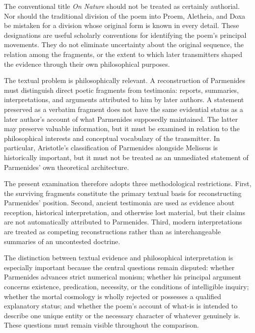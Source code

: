 
The conventional title \textit{On Nature} should not be treated
as certainly authorial. Nor should the traditional division of
the poem into Proem, Aletheia, and Doxa be mistaken for a division
whose original form is known in every detail. These designations
are useful scholarly conventions for identifying the poem's
principal movements. They do not eliminate uncertainty about
the original sequence, the relation among the fragments, or the
extent to which later transmitters shaped the evidence through
their own philosophical purposes.


The textual problem is philosophically relevant. A reconstruction
of Parmenides must distinguish direct poetic fragments from
testimonia: reports, summaries, interpretations, and arguments
attributed to him by later authors. A statement preserved as a
verbatim fragment does not have the same evidential status as a
later author's account of what Parmenides supposedly maintained.
The latter may preserve valuable information, but it must be
examined in relation to the philosophical interests and conceptual
vocabulary of the transmitter. In particular, Aristotle's
classification of Parmenides alongside Melissus is historically
important, but it must not be treated as an unmediated statement
of Parmenides' own theoretical architecture.


The present examination therefore adopts three methodological
restrictions. First, the surviving fragments constitute the
primary textual basis for reconstructing Parmenides' position.
Second, ancient testimonia are used as evidence about reception,
historical interpretation, and otherwise lost material, but
their claims are not automatically attributed to Parmenides.
Third, modern interpretations are treated as competing
reconstructions rather than as interchangeable summaries of
an uncontested doctrine.


The distinction between textual evidence and philosophical
interpretation is especially important because the central
questions remain disputed: whether Parmenides advances strict
numerical monism; whether his principal argument concerns
existence, predication, necessity, or the conditions of
intelligible inquiry; whether the mortal cosmology is wholly
rejected or possesses a qualified explanatory status; and
whether the poem's account of what-is is intended to describe
one unique entity or the necessary character of whatever
genuinely is. These questions must remain visible throughout
the comparison.

